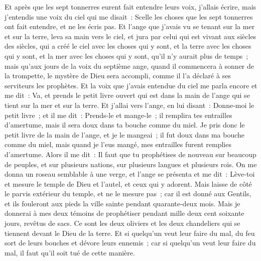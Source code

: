\begin{multicols}{2}
Et après que les sept tonnerres eurent fait entendre leurs voix, j'allais écrire, mais j'entendis une voix du ciel qui me disait~: Scelle les choses que les sept tonnerres ont fait entendre, et ne les écris pas.
Et l'ange que j'avais vu se tenant sur la mer et sur la terre, leva sa main vers le ciel,
et jura par celui qui est vivant aux siècles des siècles, qui a créé le ciel avec les choses qui y sont, et la terre avec les choses qui y sont, et la mer avec les choses qui y sont, qu'il n'y aurait plus de temps~;
mais qu'aux jours de la voix du septième ange, quand il commencera à sonner de la trompette, le mystère de Dieu sera accompli, comme il l'a déclaré à ses serviteurs les prophètes.
Et la voix que j'avais entendue du ciel me parla encore et me dit~: Va, et prends le petit livre ouvert qui est dans la main de l'ange qui se tient sur la mer et sur la terre.
Et j'allai vers l'ange, en lui disant~: Donne-moi le petit livre~; et il me dit~: Prends-le et mange-le~; il remplira tes entrailles d'amertume, mais il sera doux dans ta bouche comme du miel.
Je pris donc le petit livre de la main de l'ange, et je le mangeai~; il fut doux dans ma bouche comme du miel, mais quand je l'eus mangé, mes entrailles furent remplies d'amertume.
Alors il me dit~: Il faut que tu prophétises de nouveau sur beaucoup de peuples, et sur plusieurs nations, sur plusieurs langues et plusieurs rois.
\VerseOne{}On me donna un roseau semblable à une verge, et l'ange se présenta et me dit~: Lève-toi et mesure le temple de Dieu et l'autel, et ceux qui y adorent.
Mais laisse de côté le parvis extérieur du temple, et ne le mesure pas~; car il est donné aux Gentils, et ils fouleront aux pieds la ville sainte pendant quarante-deux mois.
Mais je donnerai à mes deux témoins de prophétiser pendant mille deux cent soixante jours, revêtus de sacs.
Ce sont les deux oliviers et les deux chandeliers qui se tiennent devant le Dieu de la terre.
Et si quelqu'un veut leur faire du mal, du feu sort de leurs bouches et dévore leurs ennemis~; car si quelqu'un veut leur faire du mal, il faut qu'il soit tué de cette manière.

\end{multicols}

